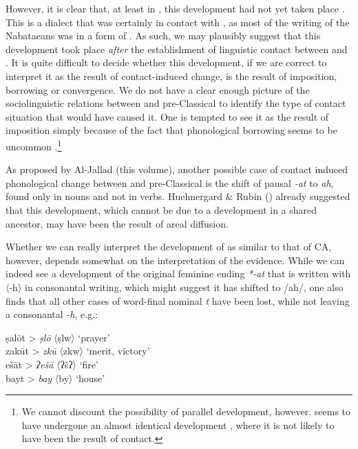 \documentclass[output=paper]{langsci/langscibook}
\begin{document}
However, it is clear that, at least in  , this development had not yet taken place \citep[91--93]{Diem1980}. This is a dialect that was certainly in contact with , as most of the writing of the Nabataeans was in a form of . As such, we may plausibly suggest that this development took place \textit{after} the establishment of linguistic contact between  and . It is quite difficult to decide whether this development, if we are correct to interpret it as the result of contact-induced change, is the result of {imposition}, borrowing or {convergence}. We do not have a clear enough picture of the sociolinguistic relations between  and pre-Classical  to identify the type of contact situation that would have caused it. One is tempted to see it as the result of {imposition} simply because of the fact that phonological borrowing seems to be uncommon \citep[526]{Lucas2015}.\footnote{We cannot discount the possibility of parallel development, however.  seems to have undergone an almost identical development \citep[196]{Huehnergard1997}, where it is not likely to have been the result of contact.} 

As proposed by Al-Jallad (this volume), another possible case of contact induced phonological change between  and pre-Classical  is the shift of pausal \textit{-at} to \textit{ah}, found only in nouns and not in verbs. Huehnergard \& Rubin (\citeyear[267--268]{HuehnergardRubin2011}) already suggested that this development, which cannot be due to a development in a shared ancestor, may have been the result of areal {diffusion}.

Whether we can really interpret the development of  as similar to that of CA, however, depends somewhat on the interpretation of the  evidence. While we can indeed see a development of the original  feminine ending \textit{*-at} that is written with 〈-h〉 in consonantal writing, which might suggest it has shifted to /ah/, one also finds that all other cases of word-final nominal \textit{t} have been lost, while not leaving a consonantal \textit{-h}, e.g.: 

\ea
\ea *ṣalōt > \textit{ṣlō} 〈ṣlw〉 ‘prayer’\\
\ex *zakūt > \textit{zkū} 〈zkw〉 ‘merit, victory’\\
\ex *ešāt > \textit{ʔešā} 〈ʔšʔ〉 ‘fire’\\
\ex *bayt > \textit{bay}  〈by〉 ‘house’
\z
\z
\end{document}
